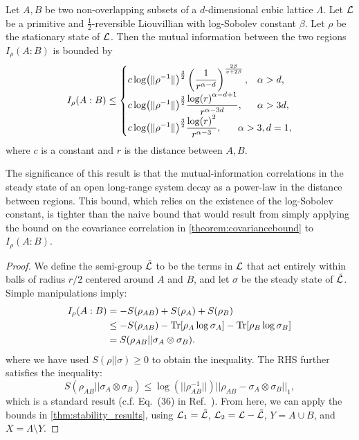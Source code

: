\begin{theorem} 
\label{thm:mutual_information_clustering}
Let $A,B$ be two non-overlapping subsets of a $d$-dimensional cubic lattice $\Lambda$.  Let $\mathcal{L} $  be a primitive and $\frac12$-reversible Liouvillian with log-Sobolev constant $\beta$. Let $\rho$ be the stationary state of $\mathcal{L}$. Then the mutual information between the two regions $I_\rho(A:B)$ is bounded by
\begin{equation}
I_\rho(A:B)  \leq \begin{cases}
       \ds c \log (  \lVert \rho^{-1}  \lVert)^{\frac32} \left( \frac1{r^{\alpha - d}} \right)^{\frac{2 \beta}{ v + 2\beta}},& \al > d,
    \\ \ds  c \log (  \lVert \rho^{-1}  \lVert)^{\frac32} \frac{\log(r)^{\al-d+1}}{r^{\al-3d}},& \al > 3d,
    \\ \ds c\log (  \lVert \rho^{-1}  \lVert)^{\frac32} \frac{\log(r)^2}{r^{\al-3}},& \hspace{-2em}\al> 3, d=1,
    \end{cases}
\end{equation}
where $c$ is a constant and $r$ is the distance between $A,B$.
\end{theorem}

The significance of this result is that the mutual-information correlations in the steady state of an open long-range system decay as a power-law in the distance between regions.
This bound, which relies on the existence of the log-Sobolev constant, is tighter than the naive bound that would result from simply applying the bound on the covariance correlation in \cref{theorem:covariancebound} to $I_\rho(A:B)$.

\begin{proof}

We define the semi-group $\tilde{\mathcal{L}}$ to be the terms in $\mathcal{L}$ that act entirely within balls of radius $r/2$ centered around $A$ and $B$, and let $\sigma$ be the steady state of  $\tilde{\mathcal{L}}$. Simple manipulations imply:
\begin{align}
I_\rho(A:B) &= - S(\rho_{AB})  + S(\rho_A)  + S(\rho_B) \\
& \leq  - S(\rho_{AB})  - \text{Tr}[ \rho_A \log \sigma_A ] -  \text{Tr}[ \rho_B \log \sigma_B ] \\
&=  S(\rho_{AB} || \sigma_A \otimes \sigma_B).
\end{align}
where we have used $S(\rho || \sigma) \geq 0$ to obtain the inequality.
The RHS further  satisfies the inequality:
\begin{equation}
S(\rho_{AB} || \sigma_A \otimes \sigma_B) \leq \log( ||\rho_{AB}^{-1} ||) || \rho_{AB} - \sigma_A \otimes \sigma_B ||_1,
\end{equation}
which is a standard result (c.f. Eq.~(36) in Ref.~\cite{Kastoryano2013}).
From here, we can apply the bounds in \cref{thm:stability_results}, using $\mathcal{L}_1 = \tilde {\mathcal{L}} $, $\mathcal{L}_2 = \mathcal{L} - \tilde {\mathcal{L}}$, $Y = A\cup B$, and $X = \Lambda \setminus Y$.
\end{proof}

